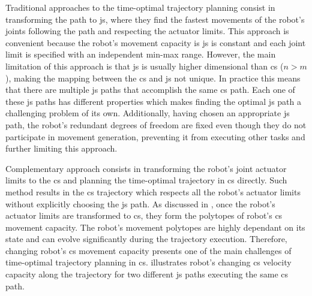 Traditional approaches to the time-optimal trajectory planning consist in transforming the path to \gls{js}, where they find the fastest movements of the robot's joints following the path and respecting the actuator limits.
This approach is convenient because the robot's movement capacity is \gls{js} is constant and each joint limit is specified with an independent min-max range. 
However, the main limitation of this approach is that \gls{js} is usually higher dimensional than \gls{cs} ($n>m$), making the mapping between the \gls{cs} and \gls{js} not unique. In practice this means that there are multiple \gls{js} paths that accomplish the same \gls{cs} path. Each one of these \gls{js} paths has different properties which makes finding the optimal \gls{js} path a challenging problem of its own. Additionally, having chosen an appropriate \gls{js} path, the robot's redundant degrees of freedom are fixed even though they do not participate in movement generation, preventing it from executing other tasks and further limiting this approach.

Complementary approach consists in transforming the robot’s joint actuator limits to the \gls{cs} and planning the time-optimal trajectory in \gls{cs} directly.
Such method results in the \gls{cs} trajectory which respects all the robot's actuator limits without explicitly choosing the \gls{js} path. 
As discussed in , once the robot's actuator limits are transformed to \gls{cs}, they form the polytopes of robot's \gls{cs} movement capacity.
The robot's movement polytopes are highly dependant on its state and can evolve significantly during the trajectory execution. 
Therefore, changing robot's \gls{cs} movement capacity presents one of the main challenges of time-optimal trajectory planning in \gls{cs}. 
 illustrates robot's changing \gls{cs} velocity capacity along the trajectory for two different \gls{js} paths executing the same \gls{cs} path. 

